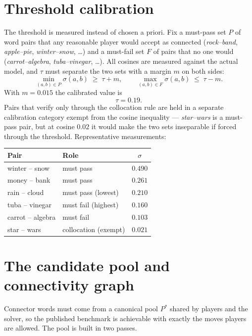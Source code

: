 \documentclass[11pt]{article}
\newcommand{\cosim}{\sigma}
\newcommand{\thresh}{\tau}
\begin{document}
\section{Threshold calibration}

The threshold is measured instead of chosen a priori. Fix a must-pass set $P$
of word pairs that any reasonable player would accept as connected
(\emph{rock--band}, \emph{apple--pie}, \emph{winter--snow}, \dots) and a
must-fail set $F$ of pairs that no one would (\emph{carrot--algebra},
\emph{tuba--vinegar}, \dots). All cosines are measured against the actual
model, and $\thresh$ must separate the two sets with a margin $m$ on both
sides:
\[
  \min_{(a,b) \in P} \cosim(a,b) \;\ge\; \thresh + m,
  \qquad
  \max_{(a,b) \in F} \cosim(a,b) \;\le\; \thresh - m .
\]
With $m = 0.015$ the calibrated value is
\[
  \boxed{\thresh = 0.19}.
\]
Pairs that verify only through the collocation rule are held in a separate
calibration category exempt from the cosine inequality --- \emph{star--wars}
is a must-pass pair, but at cosine $0.02$ it would make the two sets
inseparable if forced through the threshold. Representative measurements:

\begin{center}
\begin{tabular}{llc}
\toprule
Pair & Role & $\cosim$ \\
\midrule
winter -- snow    & must pass                & $0.490$ \\
money -- bank     & must pass                & $0.261$ \\
rain -- cloud     & must pass (lowest)       & $0.210$ \\
tuba -- vinegar   & must fail (highest)      & $0.160$ \\
carrot -- algebra & must fail                & $0.103$ \\
star -- wars      & collocation (exempt)     & $0.021$ \\
\bottomrule
\end{tabular}
\end{center}

\section{The candidate pool and connectivity graph}

Connector words must come from a canonical pool $P^\ast$ shared by players and
the solver, so the published benchmark is achievable with exactly the moves
players are allowed. The pool is built in two passes.
\end{document}
